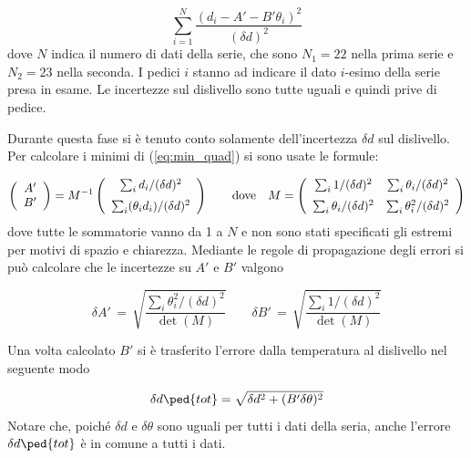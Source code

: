 \begin{equation}
    \sum_{i=1}^{N} \frac{(d_i - A' - B'\theta_i)^2}{(\delta d)^2}
    \label{eq:min_quad}
\end{equation}
%
dove $N$ indica il numero di dati della serie, che sono $N_1 = 22$ nella prima serie e $N_2 = 23$ nella seconda.
I pedici $i$ stanno ad indicare il dato $i$-esimo della serie presa in esame. Le incertezze sul dislivello sono tutte uguali e
quindi prive di pedice.

Durante questa fase si è tenuto conto solamente dell'incertezza $\delta d$ sul dislivello. Per calcolare i minimi
di (\ref{eq:min_quad}) si sono usate le formule:

\begin{equation}
    \left(
    \begin{array}{c}
        A' \\
        B'
    \end{array} 
    \right)
    =
    M^{-1}
    \left(
    \begin{array}{c}
        \sum_i d_i/(\delta d)^2 \\[2mm]
        \sum_i (\theta_i d_i)/(\delta d)^2
    \end{array} 
    \right)
    \qquad 
    \text{dove}
    \quad
    M =
    \left(
    \begin{array}{c c}
        \sum_i 1/(\delta d)^2 & \sum_i \theta_i/(\delta d)^2 \\[2mm]
        \sum_i \theta_i/(\delta d)^2 & \sum_i \theta_i^2/(\delta d)^2
    \end{array} 
    \right)
    \label{eq:A_e_B}
\end{equation}
%
dove tutte le sommatorie vanno da 1 a $N$ e non sono stati specificati gli estremi per motivi di spazio e chiarezza. Mediante le regole
di propagazione degli errori si può calcolare che le incertezze su $A'$ e $B'$ valgono

\begin{equation}
    \delta A' \,=\, \sqrt{\frac{\sum_i \theta_i^2/(\delta d)^2}{\det(M)}}
    \qquad
    \delta B' \,=\, \sqrt{\frac{\sum_i 1/(\delta d)^2}{\det(M)}}
    \label{eq:dA_e_dB}
\end{equation}

Una volta calcolato $B'$ si è trasferito l'errore dalla temperatura al dislivello nel seguente modo

\begin{equation}
    \delta d\ped{tot} = \sqrt{\delta d^2 + (B'\delta \theta)^2}
    \label{eq:err_tras_1}
\end{equation}
%
Notare che, poiché $\delta d$ e $\delta \theta$ sono uguali per tutti i dati della seria,
anche l'errore $\delta d\ped{tot}$ è in comune a tutti i dati.

